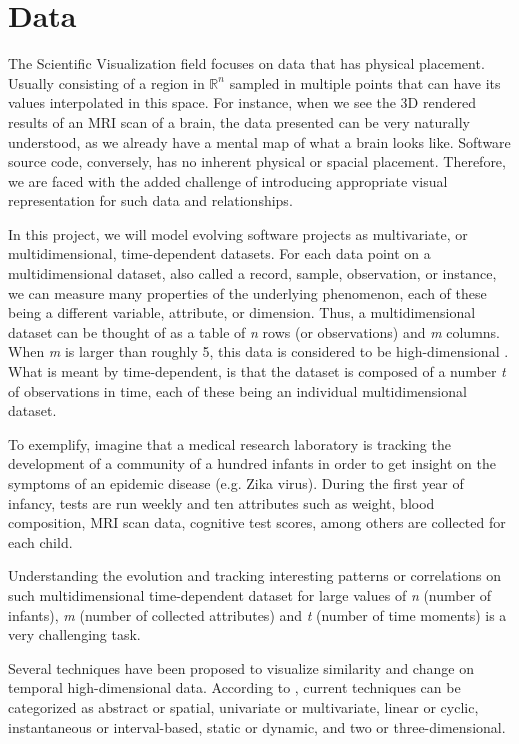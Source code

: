 \section{Data}
The Scientific Visualization field focuses on data that has physical placement. Usually consisting of a region in $\mathbb{R}^{n}$ sampled in multiple points that can have its values interpolated in this space. For instance, when we see the 3D rendered results of an MRI scan of a brain, the data presented can be very naturally understood, as we already have a mental map of what a brain looks like. Software source code, conversely, has no inherent physical or spacial placement. Therefore, we are faced with the added challenge of introducing appropriate visual representation for such data and relationships.

In this project, we will model evolving software projects as multivariate, or multidimensional, time-dependent datasets. For each data point on a multidimensional dataset, also called a record, sample, observation, or instance, we can measure many properties of the underlying phenomenon, each of these being a different variable, attribute, or dimension. Thus, a multidimensional dataset can be thought of as a table of \textit{n} rows (or observations) and \textit{m} columns. When \textit{m} is larger than roughly 5, this data is considered to be high-dimensional . What is meant by time-dependent, is that the dataset is composed of a number \textit{t} of observations in time, each of these being an individual multidimensional dataset.

To exemplify, imagine that a medical research laboratory is tracking the development of a community of a hundred infants in order to get insight on the symptoms of an epidemic disease (e.g. Zika virus). During the first year of infancy, tests are run weekly and ten attributes such as weight, blood composition, MRI scan data, cognitive test scores, among others are collected for each child.

Understanding the evolution and tracking interesting patterns or correlations on such multidimensional time-dependent dataset for large values of \textit{n} (number of infants), \textit{m} (number of collected attributes) and \textit{t} (number of time moments) is a very challenging task.

Several techniques have been proposed to visualize similarity and change on temporal high-dimensional data. According to \citet{ref:timedata}, current techniques can be categorized as abstract or spatial, univariate or multivariate, linear or cyclic, instantaneous or interval-based, static or dynamic, and two or three-dimensional.

